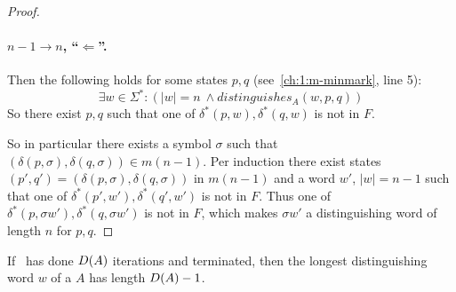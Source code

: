 \begin{proof}
	\paragraph*{$n-1 \rightarrow n$, ``$\Leftarrow$''.} 
	Then the following holds for some states $p,q$ (see~\ref{ch:1:m-minmark}, line 5):
	\[
	\exists w\in\Sigma^*\colon (|w| = n\ \land distinguishes_A(w, p, q))
	\]
	So there exist $p,q$ such that one of $\delta^*(p, w),\delta^*(q, w)$ is not in $F$.
	
	So in particular there exists a symbol $\sigma$ such that $(\delta(p,\sigma),\delta(q,\sigma)) \in m(n-1)$. Per induction there exist states $(p',q')=(\delta(p,\sigma),\delta(q,\sigma))$ in $m(n-1)$ and a word $w'$, $|w|=n-1$ such that one of $\delta^*(p', w'),\delta^*(q', w')$ is not in $F$. Thus one of $\delta^*(p, \sigma w'),\delta^*(q, \sigma w')$ is not in $F$, which makes $\sigma w'$ a distinguishing word of length $n$ for $p,q$.
\end{proof}

\begin{lemma}\label{ch:3:semantics-of-D(A)}
    If \CompDist\ has done $D(A)$ iterations and terminated, then the longest distinguishing word $w$ of a $A$ has length $D(A)-1$.
\end{lemma}

